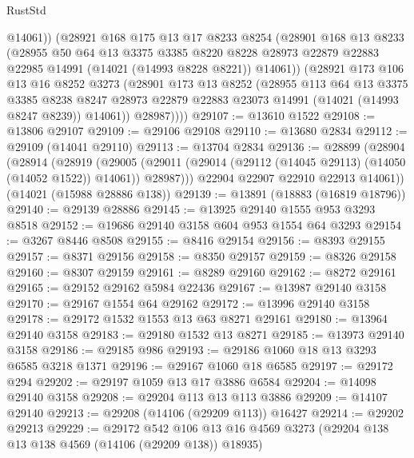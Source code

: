 \begin{lexlean}{RustStd}
\begin{coremodule}
            @14061))
        (@28921
          @168
          @175
          @13
          @17
          @8233
          @8254
          (@28901
            @168
            @13
            @8233
            (@28955
              @50
              @64
              @13
              @3375
              @3385
              @8220
              @8228
              @28973
              @22879
              @22883
              @22985
              @14991
              (@14021 (@14993 @8228 @8221))
              @14061))
          (@28921
            @173
            @106
            @13
            @16
            @8252
            @3273
            (@28901
              @173
              @13
              @8252
              (@28955
                @113
                @64
                @13
                @3375
                @3385
                @8238
                @8247
                @28973
                @22879
                @22883
                @23073
                @14991
                (@14021 (@14993 @8247 @8239))
                @14061))
            @28987))))
@29107 := @13610 @1522
@29108 := @13806 @29107
@29109 := @29106 @29108
@29110 := @13680 @2834
@29112 := @29109 (@14041 @29110)
@29113 := @13704 @2834
@29136 := @28899
    (@28904
      (@28914
        (@28919
          (@29005 (@29011 (@29014 (@29112 (@14045 @29113) (@14050 (@14052 @1522)) @14061)) @28987)))
        @22904
        @22907
        @22910
        @22913
        @14061))
    (@14021 (@15988 @28886 @138))
@29139 := @13891 (@18883 (@16819 @18796))
@29140 := @29139 @28886
@29145 := @13925 @29140 @1555 @953 @3293 @8518
@29152 := @19686 @29140 @3158 @604 @953 @1554 @64 @3293
@29154 := @3267 @8446 @8508
@29155 := @8416 @29154
@29156 := @8393 @29155
@29157 := @8371 @29156
@29158 := @8350 @29157
@29159 := @8326 @29158
@29160 := @8307 @29159
@29161 := @8289 @29160
@29162 := @8272 @29161
@29165 := @29152 @29162 @5984 @22436
@29167 := @13987 @29140 @3158
@29170 := @29167 @1554 @64 @29162
@29172 := @13996 @29140 @3158
@29178 := @29172 @1532 @1553 @13 @63 @8271 @29161
@29180 := @13964 @29140 @3158
@29183 := @29180 @1532 @13 @8271
@29185 := @13973 @29140 @3158
@29186 := @29185 @986
@29193 := @29186 @1060 @18 @13 @3293 @6585 @3218 @1371
@29196 := @29167 @1060 @18 @6585
@29197 := @29172 @294
@29202 := @29197 @1059 @13 @17 @3886 @6584
@29204 := @14098 @29140 @3158
@29208 := @29204 @113 @13 @113 @3886
@29209 := @14107 @29140
@29213 := @29208 (@14106 (@29209 @113)) @16427
@29214 := @29202 @29213
@29229 := @29172
    @542
    @106
    @13
    @16
    @4569
    @3273
    (@29204 @138 @13 @138 @4569 (@14106 (@29209 @138)) @18935)

\end{coremodule}
\end{lexlean}
